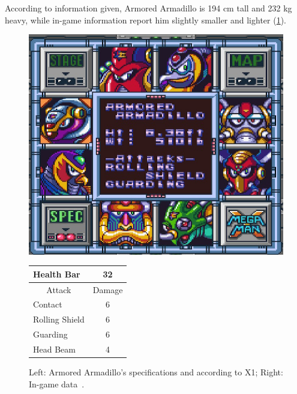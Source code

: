 According to information given, Armored Armadillo is 194 cm tall and 232 kg heavy, while in-game information report him slightly smaller and lighter (\ref{Armadillo_specs}).
\begin{figure}[htp]
	\begin{minipage}[c]{0.45\linewidth}
		\vspace{0pt}
		\centering
		\includegraphics[width=\linewidth]{figures/X1/Armored_armadillo/Armored_armadillo_specs.png}
	\end{minipage}
	\begin{minipage}[c]{0.45\linewidth}
		\centering
		\vspace{0pt}
		\begin{tabular}[h]{l c}
			\toprule
			Health Bar & 32\\
			\midrule
			\multicolumn{1}{c}{Attack} & \multicolumn{1}{c}{Damage}\\
			Contact & 6\\
			Rolling Shield& 6\\
			Guarding & 6\\
			Head Beam & 4\\
			\bottomrule
		\end{tabular}
	\end{minipage}
	\caption{Left: Armored Armadillo's specifications and according to X1; Right: In-game data~\cite{wiki:Armored_Armadillo}. }
	\label{Armadillo_specs}
\end{figure}


